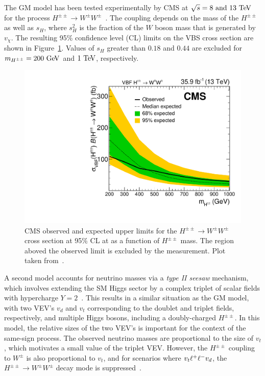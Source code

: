 The GM model has been tested experimentally by CMS at $\sqrt{s} = 8\textrm{\ and\ }13\tev$ for the process $H^{\pm\pm}\rightarrow W^{\pm}W^{\pm}$~\cite{2015.ssww-8tev-cms, 2017.ssww-13tev-cms}.
The coupling depends on the mass of the $H^{\pm\pm}$ as well as $s_H$, where $s_H^2$ is the fraction of the $W$ boson mass that is generated by $v_\chi$.
The resulting 95\% confidence level (CL) limits on the VBS cross section are shown in Figure~\ref{fig:cms-hpp-limits}.
Values of $s_H$ greater than $0.18$ and $0.44$ are excluded for $m_{H^{\pm\pm}} = 200\gev$ and $1\tev$, respectively.

\begin{figure}[htbp]
  \centering
  \includegraphics[width=.6\textwidth]{figs/ssww_13tev/extensions/cms-hpp}
  \caption[CMS observed and expected upper limits for the $H^{\pm\pm}\rightarrow W^{\pm}W^{\pm}$ cross section at 95\% CL at  as a function of $H^{\pm\pm}$ mass.  The region aboved the observed limit is excluded by the measurement.]{CMS observed and expected upper limits for the $H^{\pm\pm}\rightarrow W^{\pm}W^{\pm}$ cross section at 95\% CL at  as a function of $H^{\pm\pm}$ mass.  The region aboved the observed limit is excluded by the measurement. Plot taken from~\cite{2017.ssww-13tev-cms}.}
  \label{fig:cms-hpp-limits}
\end{figure}

A second model accounts for neutrino masses via a \emph{type II seesaw} mechanism, which involves extending the SM Higgs sector by a complex triplet of scalar fields with hypercharge $Y=2$~\cite{1980.neutrino-mass-higgs}.
This results in a similar situation as the GM model, with two VEV's $v_d$ and $v_t$ corresponding to the doublet and triplet fields, respectively, and multiple Higgs bosons, including a doubly-charged $H^{\pm\pm}$.
In this model, the relative sizes of the two VEV's is important for the context of the same-sign \sswwnojj process.
The observed neutrino masses are proportional to the size of $v_t$, which motivates a small value of the triplet VEV.
However, the $H^{\pm\pm}$ coupling to $W^\pm$ is also proportional to $v_t$, and for scenarios where $v_t \muchless v_d$, the $H^{\pm\pm}\rightarrow W^{\pm}W^{\pm}$ decay mode is suppressed~\cite{2008.type2-seesaw-lhc, 2011.higgs-type2-seesaw}.

